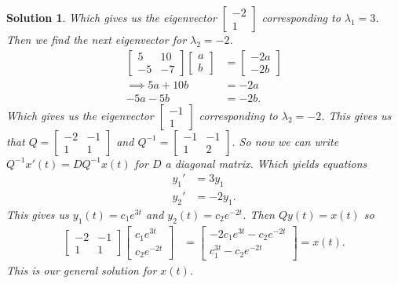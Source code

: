 \documentclass[leqno]{article}
\theoremstyle{nonumberplain}
\newtheorem{solution}{Solution}
\begin{document}
\begin{solution}
Which gives us the eigenvector $\begin{bmatrix} -2 \\1\end{bmatrix}$ corresponding to $\lambda_1=3$. Then we find the next eigenvector for $\lambda_2=-2$.
\begin{align*}
\begin{bmatrix}
5 & 10\\
-5 & -7
\end{bmatrix}
\begin{bmatrix}
a\\
b
\end{bmatrix}
&=
\begin{bmatrix}
-2a\\
-2b
\end{bmatrix}\\
\implies 5a+10b&=-2a\\
-5a-5b&=-2b.
\end{align*}
Which gives us the eigenvector $\begin{bmatrix} -1 \\1\end{bmatrix}$ corresponding to $\lambda_2=-2$. This gives us that $Q=\begin{bmatrix} -2 & -1 \\ 1 & 1 \end{bmatrix}$ and $Q^{-1}= \begin{bmatrix} -1 & -1 \\ 1 & 2 \end{bmatrix}$.  So now we can write $Q^{-1}x'(t)=DQ^{-1}x(t)$ for $D$ a diagonal matrix. Which yields equations
\begin{align*}
y_1'&=3y_1\\
y_2'&=-2y_1.
\end{align*}
This gives us $y_1(t)=c_1e^{3t}$ and $y_2(t)=c_2e^{-2t}$. Then $Qy(t)=x(t)$ so
\begin{align*}
\begin{bmatrix}
-2 & -1\\
1 & 1
\end{bmatrix}
\begin{bmatrix}
c_1 e^{3t}\\
c_2 e^{-2t}
\end{bmatrix}&=
\begin{bmatrix}
-2c_1 e^{3t} - c_2 e^{-2t}\\
c_1^{3t} - c_2 e^{-2t}
\end{bmatrix}=x(t).
\end{align*}
This is our general solution for $x(t)$.
\end{solution}
\end{document}
